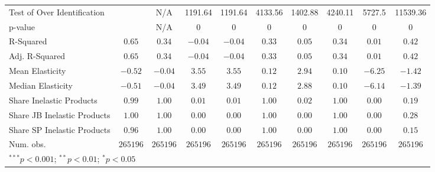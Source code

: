\begin{tabular}{l c c c c c c c c c}
Test of Over Identification &               & N/A           & 1191.64       & 1191.64       & 4133.56       & 1402.88       & 4240.11       & 5727.5        & 11539.36      \\
p-value                     &               & N/A           & 0             & 0             & 0             & 0             & 0             & 0             & 0             \\
R-Squared                   & $0.65$        & $0.34$        & $-0.04$       & $-0.04$       & $0.33$        & $0.05$        & $0.34$        & $0.01$        & $0.42$        \\
Adj. R-Squared              & $0.65$        & $0.34$        & $-0.04$       & $-0.04$       & $0.33$        & $0.05$        & $0.34$        & $0.01$        & $0.42$        \\
Mean Elasticity             & $-0.52$       & $-0.04$       & $3.55$        & $3.55$        & $0.12$        & $2.94$        & $0.10$        & $-6.25$       & $-1.42$       \\
Median Elasticity           & $-0.51$       & $-0.04$       & $3.49$        & $3.49$        & $0.12$        & $2.88$        & $0.10$        & $-6.14$       & $-1.39$       \\
Share Inelastic Products    & $0.99$        & $1.00$        & $0.01$        & $0.01$        & $1.00$        & $0.02$        & $1.00$        & $0.00$        & $0.19$        \\
Share JB Inelastic Products & $1.00$        & $1.00$        & $0.00$        & $0.00$        & $1.00$        & $0.00$        & $1.00$        & $0.00$        & $0.28$        \\
Share SP Inelastic Products & $0.96$        & $1.00$        & $0.00$        & $0.00$        & $1.00$        & $0.00$        & $1.00$        & $0.00$        & $0.15$        \\
Num. obs.                   & $265196$      & $265196$      & $265196$      & $265196$      & $265196$      & $265196$      & $265196$      & $265196$      & $265196$      \\
\bottomrule
\multicolumn{10}{l}{\scriptsize{$^{***}p<0.001$; $^{**}p<0.01$; $^{*}p<0.05$}}
\end{tabular}
